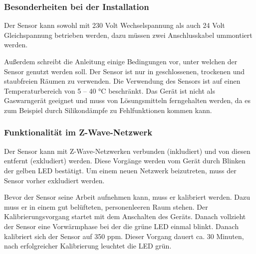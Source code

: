\subsubsection{Besonderheiten bei der Installation}
Der Sensor kann sowohl mit 230 Volt Wechselspannung als auch 24 Volt Gleichspannung betrieben werden, dazu müssen zwei Anschlusskabel ummontiert werden.

Außerdem schreibt die Anleitung einige Bedingungen vor, unter welchen der Sensor genutzt werden soll. Der Sensor ist nur in geschlossenen, trockenen und staubfreien Räumen zu verwenden. Die Verwendung des Sensors ist auf einen Temperaturbereich von 5 – 40 °C beschränkt. Das Gerät ist nicht als Gaswarngerät geeignet und muss von Lösungsmitteln ferngehalten werden, da es zum Beispiel durch Silikondämpfe zu Fehlfunktionen kommen kann. 

\subsubsection{Funktionalität im Z-Wave-Netzwerk}
Der Sensor kann mit Z-Wave-Netzwerken verbunden (inkludiert) und von diesen entfernt (exkludiert) werden. Diese Vorgänge werden vom Gerät durch Blinken der gelben LED bestätigt. Um einem neuen Netzwerk beizutreten, muss der Sensor vorher exkludiert werden.

Bevor der Sensor seine Arbeit aufnehmen kann, muss er kalibriert werden. Dazu muss er in einem gut belüfteten, personenleeren Raum stehen. Der Kalibrierungsvorgang startet mit dem Anschalten des Geräts. Danach vollzieht der Sensor eine Vorwärmphase bei der die grüne LED einmal blinkt. Danach kalibriert sich der Sensor auf 350 \gls{ppm}. Dieser Vorgang dauert ca. 30 Minuten, nach erfolgreicher Kalibrierung leuchtet die LED grün.

